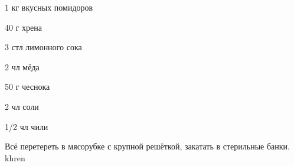{
\item 1 кг вкусных помидоров
\item 40 г хрена
\item 3 стл лимонного сока
\item 2 чл мёда
}{
\item 50 г чеснока
\item 2 чл соли
\item 1/2 чл чили 
}{
Всё перетереть в мясорубке с крупной решёткой, закатать в стерильные банки.
}{}{khren}



\recipe{}{}{}
{
\item 
}{
\item 
}{
}{}{}



